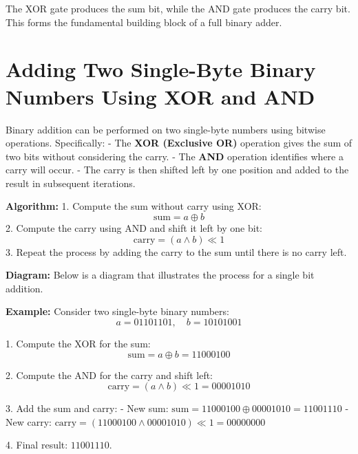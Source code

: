 \documentclass{report}
\begin{document}
The XOR gate produces the sum bit, while the AND gate produces the carry bit. This forms the fundamental building block of a full binary adder.

\section{Adding Two Single-Byte Binary Numbers Using XOR and AND}

Binary addition can be performed on two single-byte numbers using bitwise operations. Specifically:
- The \textbf{XOR (Exclusive OR)} operation gives the sum of two bits without considering the carry.
- The \textbf{AND} operation identifies where a carry will occur.
- The carry is then shifted left by one position and added to the result in subsequent iterations.

\textbf{Algorithm:}
1. Compute the sum without carry using XOR:
   \[
   \text{sum} = a \oplus b
   \]
2. Compute the carry using AND and shift it left by one bit:
   \[
   \text{carry} = (a \land b) \ll 1
   \]
3. Repeat the process by adding the carry to the sum until there is no carry left.

\textbf{Diagram:}
Below is a diagram that illustrates the process for a single bit addition.

\begin{center}
\end{center}

\textbf{Example:}
Consider two single-byte binary numbers:
\[
a = 01101101, \quad b = 10101001
\]

1. Compute the XOR for the sum:
   \[
   \text{sum} = a \oplus b = 11000100
   \]

2. Compute the AND for the carry and shift left:
   \[
   \text{carry} = (a \land b) \ll 1 = 00001010
   \]

3. Add the sum and carry:
   - New sum: \( \text{sum} = 11000100 \oplus 00001010 = 11001110 \)
   - New carry: \( \text{carry} = (11000100 \land 00001010) \ll 1 = 00000000 \)

4. Final result: \( 11001110 \).
\end{document}
